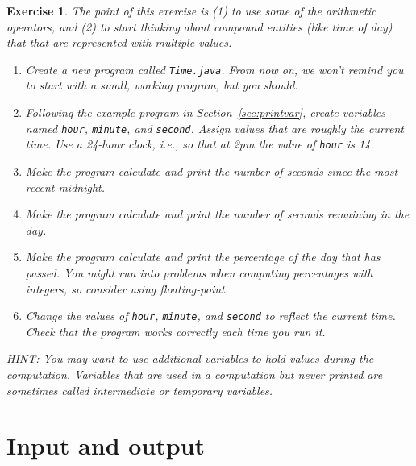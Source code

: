 \documentclass[12pt]{book}
\theoremstyle{exercise}
\newtheorem{exercise}{Exercise}[chapter]
\newcommand{\java}[1]{\verb"#1"}
\newcommand{\java}[1]{\lstinline{#1}} %
\begin{document}
\begin{exercise}

The point of this exercise is (1) to use some of the arithmetic operators, and (2) to start thinking about compound entities (like time of day) that that are represented with multiple values.

\begin{enumerate}

\item Create a new program called {\tt Time.java}.
From now on, we won't remind you to start with a small, working program, but you should.

\item Following the example program in Section~\ref{sec:printvar}, create variables named \java{hour}, \java{minute}, and \java{second}.
Assign values that are roughly the current time.
Use a 24-hour clock, i.e., so that at 2pm the value of \java{hour} is 14.

\item Make the program calculate and print the number of seconds since the most recent midnight.

\item Make the program calculate and print the number of seconds remaining in the day.

\item Make the program calculate and print the percentage of the day that has passed.
You might run into problems when computing percentages with integers, so consider using floating-point.

\item Change the values of \java{hour}, \java{minute}, and \java{second} to reflect the current time.
Check that the program works correctly each time you run it.

\end{enumerate}

HINT: You may want to use additional variables to hold values during the computation.
Variables that are used in a computation but never printed are sometimes called intermediate or temporary variables.

\end{exercise}


\chapter{Input and output}

\end{document}
